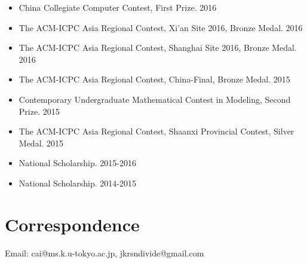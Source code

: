 \documentclass[UTF8]{ctexart}
\begin{document}
\begin{itemize}
    \item China Collegiate Computer Contest, First Prize. 2016
    \item The ACM-ICPC Asia Regional Contest, Xi’an Site 2016, Bronze Medal. 2016
    \item The ACM-ICPC Asia Regional Contest, Shanghai Site 2016, Bronze Medal. 2016
    \item The ACM-ICPC Asia Regional Contest, China-Final, Bronze Medal. 2015
    \item Contemporary Undergraduate Mathematical Contest in Modeling, Second Prize. 2015
    \item The ACM-ICPC Asia Regional Contest, Shaanxi Provincial Contest, Silver Medal. 2015
    \item National Scholarship. 2015-2016
    \item National Scholarship. 2014-2015
\end{itemize}

\section*{Correspondence}
Email: cai@ms.k.u-tokyo.ac.jp, jkrsndivide@gmail.com
\end{document}
